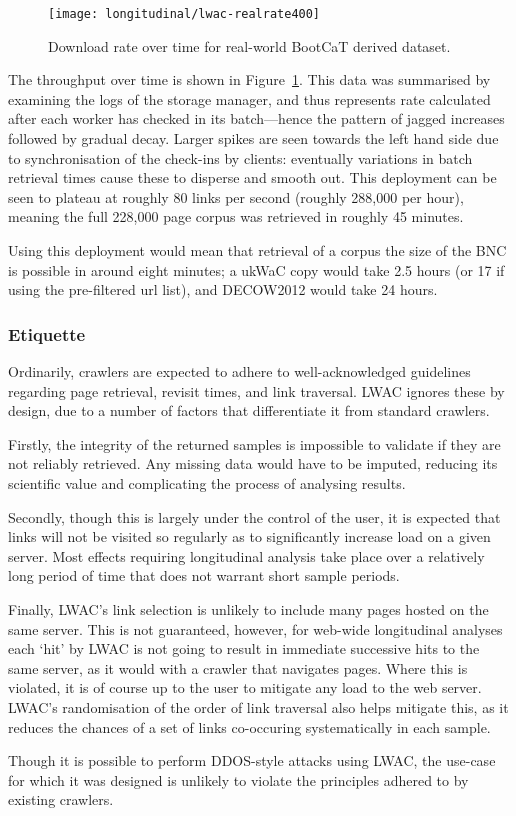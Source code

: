 \begin{figure}[Ht]
    \centering
    \texttt{[image: longitudinal/lwac-realrate400]}
    \caption{Download rate over time for real-world BootCaT derived dataset.}
    \label{fig:longitudinal:lwac:realrate400}
\end{figure}

The throughput over time is shown in Figure~\ref{fig:longitudinal:lwac:realrate400}.  This data was summarised by examining the logs of the storage manager, and thus represents rate calculated after each worker has checked in its batch---hence the pattern of jagged increases followed by gradual decay.  Larger spikes are seen towards the left hand side due to synchronisation of the check-ins by clients: eventually variations in batch retrieval times cause these to disperse and smooth out.  This deployment can be seen to plateau at roughly 80 links per second (roughly 288,000 per hour), meaning the full 228,000 page corpus was retrieved in roughly 45 minutes.

Using this deployment would mean that retrieval of a corpus the size of the BNC is possible in around eight minutes; a ukWaC\cite{ferraresi2008introducing} copy would take 2.5 hours (or 17 if using the pre-filtered url list), and DECOW2012\cite{schafer2012building} would take 24 hours.





\subsubsection{Etiquette}
Ordinarily, crawlers are expected to adhere to well-acknowledged guidelines regarding page retrieval, revisit times, and link traversal.  LWAC ignores these by design, due to a number of factors that differentiate it from standard crawlers.

Firstly, the integrity of the returned samples is impossible to validate if they are not reliably retrieved.  Any missing data would have to be imputed, reducing its scientific value and complicating the process of analysing results.

Secondly, though this is largely under the control of the user, it is expected that links will not be visited so regularly as to significantly increase load on a given server.  Most effects requiring longitudinal analysis take place over a relatively long period of time that does not warrant short sample periods.

Finally, LWAC's link selection is unlikely to include many pages hosted on the same server.  This is not guaranteed, however, for web-wide longitudinal analyses each `hit' by LWAC is not going to result in immediate successive hits to the same server, as it would with a crawler that navigates pages.  Where this is violated, it is of course up to the user to mitigate any load to the web server.  LWAC's randomisation of the order of link traversal also helps mitigate this, as it reduces the chances of a set of links co-occuring systematically in each sample.

Though it is possible to perform DDOS-style attacks using LWAC, the use-case for which it was designed is unlikely to violate the principles adhered to by existing crawlers.







